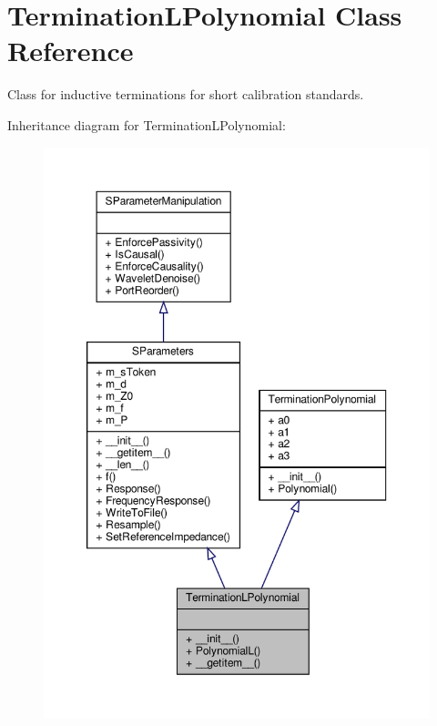 \hypertarget{classSignalIntegrity_1_1Measurement_1_1CalKit_1_1Standards_1_1TerminationPolynomial_1_1TerminationLPolynomial}{}\section{Termination\+L\+Polynomial Class Reference}
\label{classSignalIntegrity_1_1Measurement_1_1CalKit_1_1Standards_1_1TerminationPolynomial_1_1TerminationLPolynomial}


Class for inductive terminations for short calibration standards.  




Inheritance diagram for Termination\+L\+Polynomial\+:\nopagebreak
\begin{figure}[H]
\begin{center}
\leavevmode
\includegraphics[width=350pt]{classSignalIntegrity_1_1Measurement_1_1CalKit_1_1Standards_1_1TerminationPolynomial_1_1TerminationLPolynomial__inherit__graph}
\end{center}
\end{figure}


